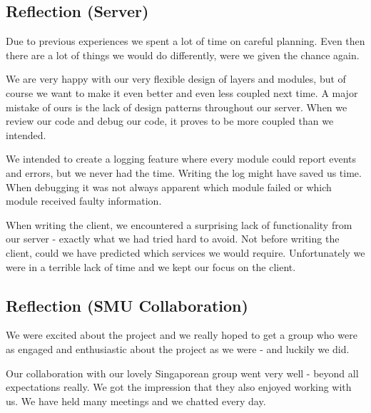 \subsection{Reflection (Server)}
Due to previous experiences we spent a lot of time on careful planning. Even then there are a lot of things we would do differently, were we given the chance again.

We are very happy with our very flexible design of layers and modules, but of course we want to make it even better and even less coupled next time. A major mistake of ours is the lack of design patterns throughout our server. When we review our code and debug our code, it proves to be more coupled than we intended. 

We intended to create a logging feature where every module could report events and errors, but we never had the time. Writing the log might have saved us time. When debugging it was not always apparent which module failed or which module received faulty information. 

When writing the client, we encountered a surprising lack of functionality from our server - exactly what we had tried hard to avoid. Not before writing the client, could we have predicted which services we would require. Unfortunately we were in a terrible lack of time and we kept our focus on the client.

\subsection{Reflection (SMU Collaboration)}
We were excited about the project and we really hoped to get a group who were as engaged and enthusiastic about the project as we were - and luckily we did.

Our collaboration with our lovely Singaporean group went very well - beyond all expectations really. We got the impression that they also enjoyed working with us. We have held many meetings and we chatted every day.
\newpage